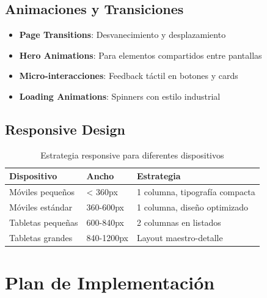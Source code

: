 \documentclass[12pt]{article}
\begin{document}
\subsection{Animaciones y Transiciones}
\begin{itemize}
    \item \textbf{Page Transitions}: Desvanecimiento y desplazamiento
    \item \textbf{Hero Animations}: Para elementos compartidos entre pantallas
    \item \textbf{Micro-interacciones}: Feedback táctil en botones y cards
    \item \textbf{Loading Animations}: Spinners con estilo industrial
\end{itemize}

\subsection{Responsive Design}
\begin{table}[H]
\centering
\begin{tabularx}{\textwidth}{|l|l|X|}
\hline
\textbf{Dispositivo} & \textbf{Ancho} & \textbf{Estrategia} \\
\hline
Móviles pequeños & < 360px & 1 columna, tipografía compacta \\
\hline
Móviles estándar & 360-600px & 1 columna, diseño optimizado \\
\hline
Tabletas pequeñas & 600-840px & 2 columnas en listados \\
\hline
Tabletas grandes & 840-1200px & Layout maestro-detalle \\
\hline
\end{tabularx}
\caption{Estrategia responsive para diferentes dispositivos}
\end{table}

\section{Plan de Implementación}
\label{sec:implementacion}
\end{document}
